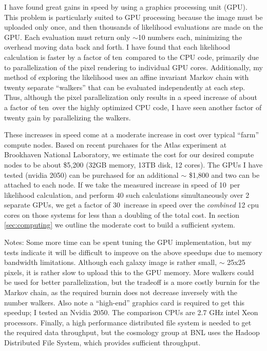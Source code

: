 \documentclass[12pt]{article}
\newcommand{\speedupnum}{10}
\newcommand{\speedup}{ten}
\newcommand{\overallspeedup}{30}
\begin{document}
I have found great gains in speed by using a graphics processing unit (GPU).
This problem is particularly suited to GPU processing because the image must be
uploaded only once, and then thousands of likelihood evaluations are made on
the GPU. Each evaluation must return only $\sim$10 numbers each, minimizing the
overhead moving data back and forth.  I have found that each likelihood
calculation is faster by a factor of \speedup\ compared to the CPU code,
primarily due to parallelization of the pixel rendering to individual GPU
cores.  Additionally, my method of exploring the likelihood uses an affine
invariant Markov chain\cite{GoodmanWeare10} with twenty separate ``walkers''
that can be evaluated independently at each step.  Thus, although the pixel
parallelization only results in a speed increase of about a factor of \speedup\
over the highly optimized CPU code, I have seen another factor of twenty gain
by parallelizing the walkers.  

These increases in speed come at a moderate increase in cost over typical
``farm'' compute nodes.  Based on recent purchases for the Atlas experiment at
Brookhaven National Laboratory, we estimate the cost for our desired compute
nodes to be about \$5,200 (32GB memory, 13TB disk, 12 cores).  The GPUs I have
tested (nvidia 2050) can be purchased for an additional $\sim$ \$1,800 and two
can be attached to each node.  If we take the measured increase in speed of
\speedupnum\ per likelihood calculation, and perform 40 such calculations
simultaneously over 2 separate GPUs, we get a factor of \overallspeedup\
increase in speed over the {\it combined} 12 cpu cores on those systems for less than
a doubling of the total cost.  In section \ref{sec:computing} we outline the
moderate cost to build a sufficient system.

Notes: Some more time can be spent tuning the GPU implementation, but my tests
indicate it will be difficult to improve on the above speedups due to memory
bandwidth limitations.  Although each galaxy image is rather small, $\sim$
25x25 pixels, it is rather slow to upload this to the GPU memory.  More walkers
could be used for better parallelization, but the tradeoff is a more costly
burnin for the Markov chain, as the required burnin does not decrease inversely
with the number walkers.  Also note a ``high-end'' graphics card is required to
get this speedup; I tested an Nvidia 2050. The comparison CPUs are 2.7 GHz
intel Xeon processors.  Finally, a high performance distributed file system is
needed to get the required data throughput, but the cosmology group at BNL uses
the Hadoop Distributed File System, which provides sufficient throughput.
\end{document}
